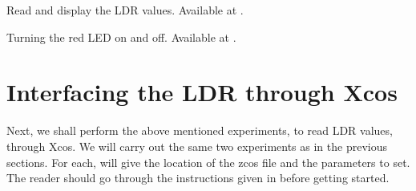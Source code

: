 \begin{scicode}
  {Read and display the LDR values.  Available at
    .}
  \label{sci:ldr-read}
  
\end{scicode}

\begin{scicode}
  {Turning the red LED on and off.  Available at
    .}
  \label{sci:ldr-led}
  
\end{scicode}

\section{Interfacing the LDR through Xcos}
Next, we shall perform the above mentioned experiments, to read LDR
values, through Xcos.  We will carry out the same two experiments as in the previous
sections.  For each, will give the location
of the zcos file and the parameters to set.  The reader should go
through the instructions given in  before
getting started.

